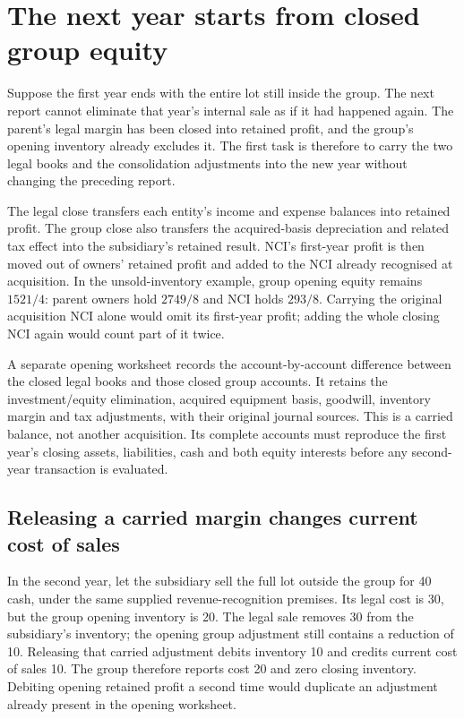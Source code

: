 \section{The next year starts from closed group equity}
\label{sec:worked-intragroup-carry}

Suppose the first year ends with the entire lot still inside the group. The
next report cannot eliminate that year's internal sale as if it had happened
again. The parent's legal margin has been closed into retained profit, and
the group's opening inventory already excludes it. The first task is therefore
to carry the two legal books and the consolidation adjustments into the new
year without changing the preceding report.

The legal close transfers each entity's income and expense balances into
retained profit. The group close also transfers the acquired-basis depreciation
and related tax effect into the subsidiary's retained result. NCI's first-year
profit is then moved out of owners' retained profit and added to the NCI
already recognised at acquisition. In the unsold-inventory example, group
opening equity remains $1521/4$: parent owners hold $2749/8$ and NCI holds
$293/8$. Carrying the original acquisition NCI alone would omit its first-year
profit; adding the whole closing NCI again would count part of it twice.

A separate opening worksheet records the account-by-account difference between
the closed legal books and those closed group accounts. It retains the
investment/equity elimination, acquired equipment basis, goodwill, inventory
margin and tax adjustments, with their original journal sources. This is a
carried balance, not another acquisition. Its complete accounts must reproduce
the first year's closing assets, liabilities, cash and both equity interests
before any second-year transaction is evaluated.

\subsection{Releasing a carried margin changes current cost of sales}

In the second year, let the subsidiary sell the full lot outside the group
for 40 cash, under the same supplied revenue-recognition premises. Its legal
cost is 30, but the group opening inventory is 20. The legal sale removes
30 from the subsidiary's inventory; the opening group adjustment still contains
a reduction of 10. Releasing that carried adjustment debits inventory 10 and
credits current cost of sales 10. The group therefore reports cost 20 and
zero closing inventory. Debiting opening retained profit a second time would
duplicate an adjustment already present in the opening worksheet.

